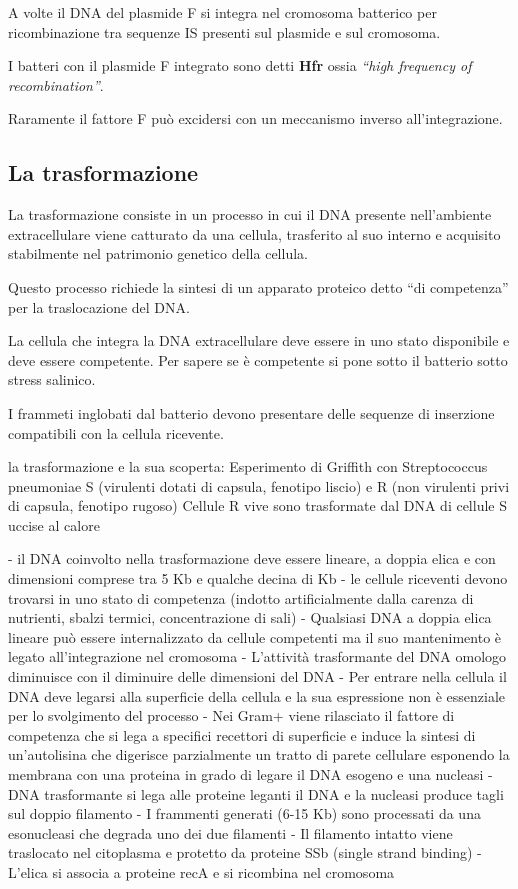 \documentclass[11pt]{book}
\begin{document}
A volte il DNA del plasmide F si integra nel cromosoma batterico per ricombinazione tra sequenze IS presenti sul plasmide e sul cromosoma.

I batteri con il plasmide F integrato sono detti \textbf{Hfr} ossia \emph{``high frequency of recombination''}.

Raramente il fattore F può excidersi con un meccanismo inverso all’integrazione.

\subsection{La trasformazione}
La trasformazione consiste in un processo in cui il DNA presente nell’ambiente extracellulare viene catturato da una cellula, trasferito al suo interno e acquisito stabilmente nel patrimonio genetico della cellula. 

Questo processo richiede la sintesi di un apparato proteico detto ``di competenza'' per la traslocazione del DNA.

\vspace{1em}
La cellula che integra la DNA extracellulare deve essere in uno stato disponibile e deve essere competente. Per sapere se è competente si pone sotto il batterio sotto stress salinico. 

I frammeti inglobati dal batterio devono presentare delle sequenze di inserzione compatibili con la cellula ricevente.






la trasformazione e la sua scoperta: Esperimento di Griffith con Streptococcus pneumoniae S (virulenti dotati di capsula, fenotipo liscio) e R (non virulenti privi di capsula, fenotipo rugoso) 
Cellule R vive sono trasformate dal DNA di cellule S uccise al calore

- il DNA coinvolto nella trasformazione deve essere lineare, a doppia elica e con dimensioni comprese tra 5 Kb e qualche decina di Kb 
- le cellule riceventi devono trovarsi in uno stato di competenza (indotto artificialmente dalla carenza di nutrienti, sbalzi termici, concentrazione di sali) 
- Qualsiasi DNA a doppia elica lineare può essere internalizzato da cellule competenti ma il suo mantenimento è legato all’integrazione nel cromosoma 
- L’attività trasformante del DNA omologo diminuisce con il diminuire delle dimensioni del DNA 
- Per entrare nella cellula il DNA deve legarsi alla superficie della cellula e la sua espressione non è essenziale per lo svolgimento del processo
- Nei Gram+ viene rilasciato il fattore di competenza che si lega a specifici recettori di 
superficie e induce la sintesi di un’autolisina che digerisce parzialmente un tratto di parete cellulare esponendo la membrana con una proteina in grado di legare il DNA esogeno e una nucleasi 
- DNA trasformante si lega alle proteine leganti il DNA e la nucleasi produce tagli sul doppio filamento 
- I frammenti generati (6-15 Kb) sono processati da una esonucleasi che degrada uno dei due filamenti 
- Il filamento intatto viene traslocato nel citoplasma e protetto da proteine SSb (single strand binding) 
- L’elica si associa a proteine recA e si ricombina nel cromosoma
\end{document}
